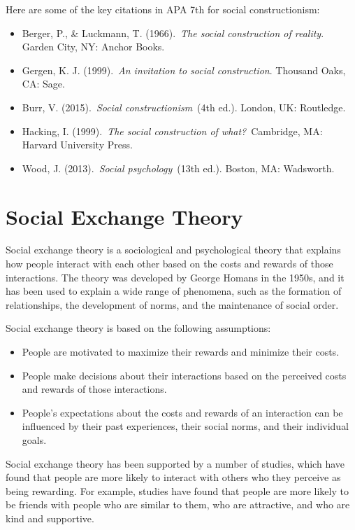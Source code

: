 \documentclass[
]{book}
\begin{document}
Here are some of the key citations in APA 7th for social constructionism:

\begin{itemize}
\item
  Berger, P., \& Luckmann, T. (1966).~\emph{The social construction of reality}. Garden City, NY: Anchor Books.
\item
  Gergen, K. J. (1999).~\emph{An invitation to social construction}. Thousand Oaks, CA: Sage.
\item
  Burr, V. (2015).~\emph{Social constructionism}~(4th ed.). London, UK: Routledge.
\item
  Hacking, I. (1999).~\emph{The social construction of what?}~Cambridge, MA: Harvard University Press.
\item
  Wood, J. (2013).~\emph{Social psychology}~(13th ed.). Boston, MA: Wadsworth.
\end{itemize}

\section{Social Exchange Theory}\label{social-exchange-theory}

Social exchange theory is a sociological and psychological theory that explains how people interact with each other based on the costs and rewards of those interactions. The theory was developed by George Homans in the 1950s, and it has been used to explain a wide range of phenomena, such as the formation of relationships, the development of norms, and the maintenance of social order.

Social exchange theory is based on the following assumptions:

\begin{itemize}
\item
  People are motivated to maximize their rewards and minimize their costs.
\item
  People make decisions about their interactions based on the perceived costs and rewards of those interactions.
\item
  People's expectations about the costs and rewards of an interaction can be influenced by their past experiences, their social norms, and their individual goals.
\end{itemize}

Social exchange theory has been supported by a number of studies, which have found that people are more likely to interact with others who they perceive as being rewarding. For example, studies have found that people are more likely to be friends with people who are similar to them, who are attractive, and who are kind and supportive.
\end{document}
